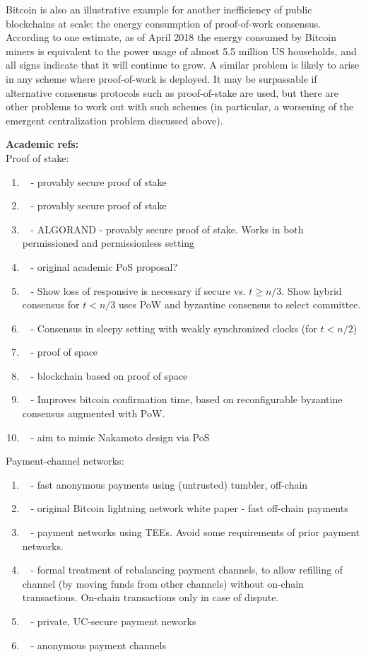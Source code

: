 Bitcoin is also an illustrative example for another inefficiency of public blockchains at scale: the energy consumption of proof-of-work consensus. According to one estimate\cite{Digiconomist}, as of April 2018 the energy consumed by Bitcoin miners is equivalent to the power usage of almost 5.5 million US households, and all signs indicate that it will continue to grow. A similar problem is likely to arise in any scheme where proof-of-work is deployed. It may be surpassable if alternative consensus protocols such as proof-of-stake are used, but there are other problems to work out with such schemes (in particular, a worsening of the emergent centralization problem discussed above). 

\noindent
\textbf{Academic refs:}\\
Proof of stake:
\begin{enumerate}
\item ~\cite{CRYPTO:KRDO17} - provably secure proof of stake
\item ~\cite{eprint:BenPasShi16} - provably secure proof of stake
\item ~\cite{SOSP:GHMVZ17} - ALGORAND - provably secure proof of stake.  Works in both permissioned and permissionless setting
\item ~\cite{FC:BenGabMiz16} - original academic PoS proposal?
\item ~\cite{DISC:PasShi17} - Show loss of responsive is necessary if secure vs. $t\ge n/3$.  Show hybrid consensus for $t< n/3$ uses PoW and byzantine consensus to select committee.
\item ~\cite{AC:PasShi17} - Consensus in sleepy setting with weakly synchronized clocks (for $t<n/2$)
\item ~\cite{CRYPTO:DFKP15} - proof of space
\item ~\cite{eprint:PPKAFG15} - blockchain based on proof of space
\item ~\cite{OPODIS:AMNRS17} - Improves bitcoin confirmation time, based on reconfigurable byzantine consensus augmented with PoW.
\item ~\cite{eprint:FanZho17} - aim to mimic Nakamoto design via PoS
\end{enumerate}
Payment-channel networks:
\begin{enumerate}
\item ~\cite{NDSS:HABSG17} - fast anonymous payments using (untrusted) tumbler, off-chain
\item ~\cite{PooDry16} - original Bitcoin lightning network white paper - fast off-chain payments
\item ~\cite{SYSTOR:LNEKPS18} - payment networks using TEEs.  Avoid some requirements of prior payment networks.
\item ~\cite{CCS:KhaGer17} - formal treatment of rebalancing payment channels, to allow refilling of channel (by moving funds from other channels) without on-chain transactions.  On-chain transactions only in case of dispute.
\item ~\cite{CCS:MMKMR17} - private, UC-secure payment neworks
\item ~\cite{CCS:GreMie17} - anonymous payment channels
\end{enumerate}
